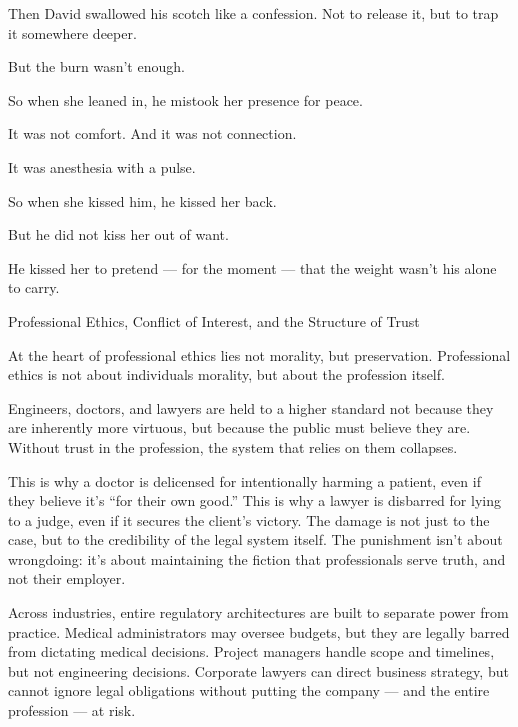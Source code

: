 Then David swallowed his scotch like a confession.
Not to release it, but to trap it somewhere deeper.

But the burn wasn’t enough.

So when she leaned in, he mistook her presence for peace.

It was not comfort. And it was not connection. 

It was anesthesia with a pulse.

So when she kissed him, he kissed her back.

But he did not kiss her out of want.

He kissed her to pretend --- for the moment --- that the weight wasn’t his alone to carry.


\medskip

\begin{PhilosophicalSidebar}{Professional Ethics, Conflict of Interest, and the Structure of Trust}

  At the heart of professional ethics lies not morality, but preservation. Professional ethics is not about individuals
  morality, but about the profession itself.

  \medskip
  
  Engineers, doctors, and lawyers are held to a higher standard not because they are inherently more virtuous, but because 
  the public must believe they are. Without trust in the profession, the system that relies on them collapses.

  \medskip
  
  
  This is why a doctor is delicensed for intentionally harming a patient, even if they believe it’s ``for their own good.''
  This is why a lawyer is disbarred for lying to a judge, even if it secures the client’s victory. The damage is not just to 
  the case, but to the credibility of the legal system itself. The punishment isn't about wrongdoing: it’s about maintaining 
  the fiction that professionals serve truth, and not their employer.

  \medskip
  
  
  Across industries, entire regulatory architectures are built to separate power from practice. Medical administrators may 
  oversee budgets, but they are legally barred from dictating medical decisions. Project managers handle scope and timelines, but 
  not engineering decisions. Corporate lawyers can direct business strategy, but cannot ignore legal obligations without 
  putting the company — and the entire profession — at risk.


\end{PhilosophicalSidebar}

